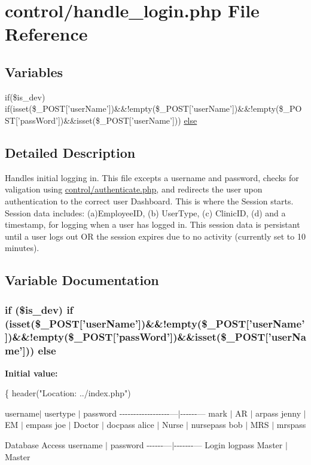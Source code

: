 \hypertarget{handle__login_8php}{\section{control/handle\-\_\-login.php File Reference}
\label{handle__login_8php}
}
\subsection*{Variables}
\begin{DoxyCompactItemize}
\item 
if(\$is\-\_\-dev) if(isset(\$\-\_\-\-P\-O\-S\-T\mbox{[}'user\-Name'\mbox{]})\&\&!empty(\$\-\_\-\-P\-O\-S\-T\mbox{[}'user\-Name'\mbox{]})\&\&!empty(\$\-\_\-\-P\-O\-S\-T\mbox{[}'pass\-Word'\mbox{]})\&\&isset(\$\-\_\-\-P\-O\-S\-T\mbox{[}'user\-Name'\mbox{]})) \hyperlink{handle__login_8php_a8ccfa260cf1b11e9f57f551d5e02f56e}{else}
\end{DoxyCompactItemize}


\subsection{Detailed Description}
Handles initial logging in. This file excepts a username and password, checks for valigation using \hyperlink{authenticate_8php}{control/authenticate.\-php}, and redirects the user upon authentication to the correct user Dashboard. This is where the Session starts. Session data includes\-: (a)Employee\-I\-D, (b) User\-Type, (c) Clinic\-I\-D, (d) and a timestamp, for logging when a user has logged in. This session data is persistant until a user logs out O\-R the session expires due to no activity (currently set to 10 minutes). 

\subsection{Variable Documentation}
\hypertarget{handle__login_8php_a8ccfa260cf1b11e9f57f551d5e02f56e}{
\subsubsection[{else}]{\setlength{\rightskip}{0pt plus 5cm}if (\$is\-\_\-dev) if (isset(\$\-\_\-\-P\-O\-S\-T\mbox{[}'user\-Name'\mbox{]})\&\&!empty(\$\-\_\-\-P\-O\-S\-T\mbox{[}'user\-Name'\mbox{]})\&\&!empty(\$\-\_\-\-P\-O\-S\-T\mbox{[}'pass\-Word'\mbox{]})\&\&isset(\$\-\_\-\-P\-O\-S\-T\mbox{[}'user\-Name'\mbox{]})) else}}\label{handle__login_8php_a8ccfa260cf1b11e9f57f551d5e02f56e}
{\bfseries Initial value\-:}
\begin{DoxyCode}
\{                                          
  header(\textcolor{stringliteral}{"Location: ../index.php"})
\end{DoxyCode}
username$\vert$ usertype $\vert$ password -\/-\/-\/-\/-\/-\/-\/-\/-\/-\/-\/-\/-\/-\/-\/-\/-\/-\/---$\vert$-\/-\/-\/-\/-\/-\/--- mark $\vert$ A\-R $\vert$ arpass jenny $\vert$ E\-M $\vert$ empass joe $\vert$ Doctor $\vert$ docpass alice $\vert$ Nurse $\vert$ nursepass bob $\vert$ M\-R\-S $\vert$ mrspass

Database Access username $\vert$ password -\/-\/-\/-\/-\/-\/---$\vert$-\/-\/-\/-\/-\/-\/-\/--- Login logpass Master $\vert$ Master 